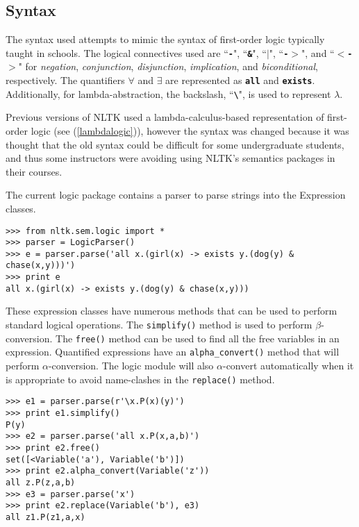 \documentclass{article}
\newcommand{\dhgcode}[1]{{\tt #1}}
\begin{document}
\subsection{Syntax}
The syntax used attempts to mimic the syntax of first-order logic typically taught in schools.  The logical connectives used are ``\textbf{\dhgcode{-}}", ``\textbf{\dhgcode{\&}}", ``\textbf{\dhgcode{$|$}}", ``\textbf{\dhgcode{-$>$}}", and ``\textbf{\dhgcode{$<$-$>$}}" for \emph{negation}, \emph{conjunction}, \emph{disjunction}, \emph{implication}, and \emph{biconditional}, respectively.  The quantifiers $\forall$ and $\exists$ are represented as \textbf{\dhgcode{all}} and \textbf{\dhgcode{exists}}.  Additionally, for lambda-abstraction, the backslash, ``\textbf{\dhgcode{\textbackslash}}", is used to represent \textbf{\emph{$\lambda$}}.

Previous versions of NLTK used a lambda-calculus-based representation of first-order logic (see (\ref{lambdalogic})), however the syntax was changed because it was thought that the old syntax could be difficult for some undergraduate students, and thus some instructors were avoiding using NLTK's semantics packages in their courses.

\enumsentence{\label{lambdalogic}\dhgcode{all x.((girl x) implies (some y.((dog y) and (chase y x))))}}

The current logic package contains a parser to parse strings into the Expression classes.

\begin{verbatim}
>>> from nltk.sem.logic import *
>>> parser = LogicParser()
>>> e = parser.parse('all x.(girl(x) -> exists y.(dog(y) & 
chase(x,y)))')
>>> print e
all x.(girl(x) -> exists y.(dog(y) & chase(x,y)))
\end{verbatim}

These expression classes have numerous methods that can be used to perform standard logical operations.  The \dhgcode{simplify()} method is used to perform $\beta$-conversion.  The \dhgcode{free()} method can be used to find all the free variables in an expression.  Quantified expressions have an \dhgcode{alpha\_convert()} method that will perform $\alpha$-conversion.  The logic module will also $\alpha$-convert automatically when it is appropriate to avoid name-clashes in the \dhgcode{replace()} method.

\begin{verbatim}
>>> e1 = parser.parse(r'\x.P(x)(y)')
>>> print e1.simplify()
P(y)
>>> e2 = parser.parse('all x.P(x,a,b)')
>>> print e2.free()
set([<Variable('a'), Variable('b')])
>>> print e2.alpha_convert(Variable('z'))
all z.P(z,a,b)
>>> e3 = parser.parse('x')
>>> print e2.replace(Variable('b'), e3)
all z1.P(z1,a,x)
\end{verbatim}
\end{document}
